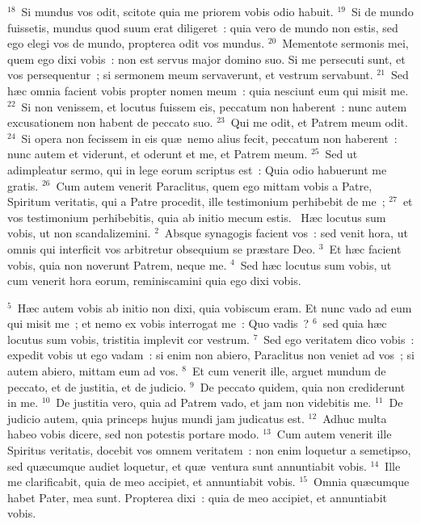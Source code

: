 ${}^{18}$~Si mundus vos odit, scitote quia me priorem vobis odio habuit.
${}^{19}$~Si de mundo fuissetis, mundus quod suum erat diligeret~: quia vero de mundo non estis, sed ego elegi vos de mundo, propterea odit vos mundus.
${}^{20}$~Mementote sermonis mei, quem ego dixi vobis~: non est servus major domino suo. Si me persecuti sunt, et vos persequentur~; si sermonem meum servaverunt, et vestrum servabunt.
${}^{21}$~Sed h\ae c omnia facient vobis propter nomen meum~: quia nesciunt eum qui misit me.
${}^{22}$~Si non venissem, et locutus fuissem eis, peccatum non haberent~: nunc autem excusationem non habent de peccato suo.
${}^{23}$~Qui me odit, et Patrem meum odit.
${}^{24}$~Si opera non fecissem in eis qu\ae\ nemo alius fecit, peccatum non haberent~: nunc autem et viderunt, et oderunt et me, et Patrem meum.
${}^{25}$~Sed ut adimpleatur sermo, qui in lege eorum scriptus est~: Quia odio habuerunt me gratis.
${}^{26}$~Cum autem venerit Paraclitus, quem ego mittam vobis a Patre, Spiritum veritatis, qui a Patre procedit, ille testimonium perhibebit de me~;
${}^{27}$~et vos testimonium perhibebitis, quia ab initio mecum estis.
~\lettrine[lines=10,image=true,loversize=0.05,lraise=-0.03]{H}{}\ae c locutus sum vobis, ut non scandalizemini.
${}^{2}$~Absque synagogis facient vos~: sed venit hora, ut omnis qui interficit vos arbitretur obsequium se pr\ae stare Deo.
${}^{3}$~Et h\ae c facient vobis, quia non noverunt Patrem, neque me.
${}^{4}$~Sed h\ae c locutus sum vobis, ut cum venerit hora eorum, reminiscamini quia ego dixi vobis.


${}^{5}$~H\ae c autem vobis ab initio non dixi, quia vobiscum eram. Et nunc vado ad eum qui misit me~; et nemo ex vobis interrogat me~: Quo vadis~?
${}^{6}$~sed quia h\ae c locutus sum vobis, tristitia implevit cor vestrum.
${}^{7}$~Sed ego veritatem dico vobis~: expedit vobis ut ego vadam~: si enim non abiero, Paraclitus non veniet ad vos~; si autem abiero, mittam eum ad vos.
${}^{8}$~Et cum venerit ille, arguet mundum de peccato, et de justitia, et de judicio.
${}^{9}$~De peccato quidem, quia non crediderunt in me.
${}^{10}$~De justitia vero, quia ad Patrem vado, et jam non videbitis me.
${}^{11}$~De judicio autem, quia princeps hujus mundi jam judicatus est.
${}^{12}$~Adhuc multa habeo vobis dicere, sed non potestis portare modo.
${}^{13}$~Cum autem venerit ille Spiritus veritatis, docebit vos omnem veritatem~: non enim loquetur a semetipso, sed qu\ae cumque audiet loquetur, et qu\ae\ ventura sunt annuntiabit vobis.
${}^{14}$~Ille me clarificabit, quia de meo accipiet, et annuntiabit vobis.
${}^{15}$~Omnia qu\ae cumque habet Pater, mea sunt. Propterea dixi~: quia de meo accipiet, et annuntiabit vobis.


